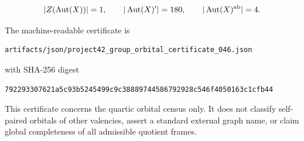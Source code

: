 \[
|Z(\operatorname{Aut}(X))|=1,
\qquad
|\operatorname{Aut}(X)'|=180,
\qquad
|\operatorname{Aut}(X)^{\mathrm{ab}}|=4.
\]

The machine-readable certificate is

\begin{verbatim}
artifacts/json/project42_group_orbital_certificate_046.json
\end{verbatim}

with SHA-256 digest

\begin{verbatim}
792293307621a5c93b5245499c9c38889744586792928c546f4050163c1cfb44
\end{verbatim}

This certificate concerns the quartic orbital census only. It does not
classify self-paired orbitals of other valencies, assert a standard
external graph name, or claim global completeness of all admissible
quotient frames.
